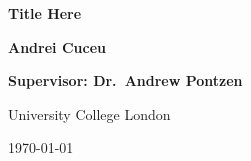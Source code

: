 \documentclass[modern,a4paper]{aastex6}
\begin{document}
\begin{titlepage}
    \begin{center}

        \vspace*{5cm}
        {\fontsize{50}{60}\selectfont \textbf{Title Here}}
        

        \vspace{3cm}

        \Huge
        \textbf{Andrei Cuceu}
        

        \vspace{1cm}

        \huge
        \textbf{Supervisor: Dr.\ Andrew Pontzen}

        \vspace{8cm}

        \huge
        University College London

        \vspace{1cm}
        \huge
        \today

    \end{center}
\end{titlepage}
\end{document}
